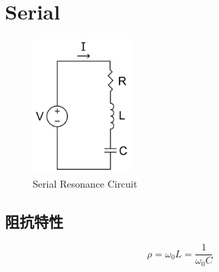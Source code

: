 \documentclass[a4paper]{report}
\begin{document}
\section{Serial}
\begin{figure}[h]
\centering
\includegraphics[width=0.33\textwidth]{s_r.png}
\caption{Serial Resonance Circuit}
\end{figure}
\subsection{阻抗特性}
$$\rho=\omega_0 L=\frac{1}{\omega_0 C}$$
\end{document}
